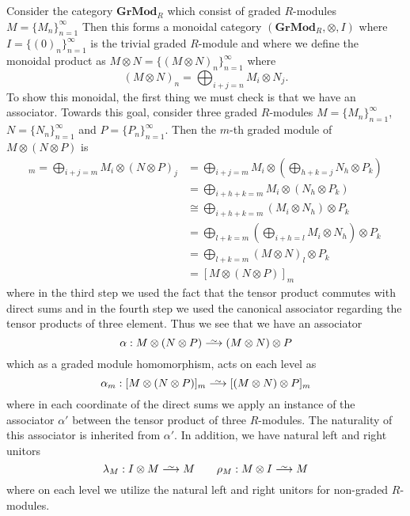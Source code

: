 \begin{example}\label{example_graded_R_modules}
    Consider the category $\textbf{GrMod}_R$ which consist of graded $R$-modules $M = \{M_n\}_{n =1}^{\infty}$ 
    Then this forms a monoidal category $(\textbf{GrMod}_R, \otimes, I)$ 
    where $I = \{(0)_n\}_{n=1}^{\infty}$ is the trivial graded $R$-module
    and where we define
    the monoidal product as $M \otimes N = \{(M \otimes N)_n\}_{n=1}^{\infty}$ where  
    \[
        (M \otimes N)_n = \bigoplus_{i + j = n}M_i \otimes N_j.
    \]
    To show this monoidal, the first thing we must check is that we have an associator. 
    Towards this goal, consider three graded $R$-modules $M = \{M_n\}_{n = 1}^{\infty}$,
    $N = \{N_n\}_{n = 1}^{\infty}$ and $P = \{P_n\}_{n = 1}^{\infty}$. Then 
    the $m$-th graded module of $M \otimes (N \otimes P)$ is 
    \begin{align*}
        [M \otimes (N \otimes P)]_m = 
        \bigoplus_{i + j = m} M_i \otimes (N \otimes P)_j
        &=
        \bigoplus_{i + j = m} M_i \otimes \left( \bigoplus_{h + k = j} N_h \otimes P_k \right)\\
        &=
        \bigoplus_{i + h + k = m} M_i \otimes (N_h \otimes P_k)\\
        &\cong
        \bigoplus_{i + h + k = m} (M_i \otimes N_h) \otimes P_k\\
        &=
        \bigoplus_{l + k = m} \left( \bigoplus_{i + h = l} M_i \otimes N_h \right) \otimes P_k\\
        &= 
        \bigoplus_{l + k = m} (M \otimes N)_l \otimes P_k\\
        &=
        [M \otimes (N \otimes P)]_m
    \end{align*}
    where in the third step we used the fact that the tensor product commutes 
    with direct sums and in the fourth step we used the canonical associator 
    regarding the tensor products of three element. 
    Thus we see that we have an associator 
    \[
        \alpha: M \otimes (N \otimes P) \isomarrow (M \otimes N)\otimes P
    \]
    which as a graded module homomorphism, acts on each level as 
    \[
        \alpha_m: [M \otimes (N \otimes P)]_m \isomarrow [(M \otimes N) \otimes P]_m
    \]
    where in each coordinate of the direct sums we apply an instance of the associator 
    $\alpha'$ between the tensor product of three $R$-modules. The naturality of this 
    associator is inherited from $\alpha'$.
    In addition, we have natural left and right unitors 
    \[
        \lambda_M: I \otimes M \isomarrow M \qquad \rho_M: M \otimes I \isomarrow M
    \]
    where on each level we utilize the natural left and right unitors for non-graded 
    $R$-modules.
\end{example}

